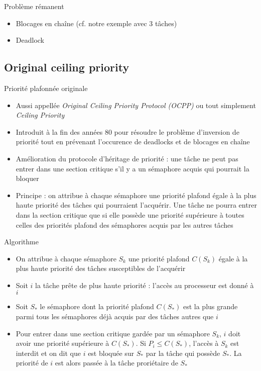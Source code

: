 \begin{frame}{Problème rémanent} 
  \begin{itemize}
  \item Blocages en chaîne (cf. notre exemple avec 3 tâches)
  \item Deadlock
  \end{itemize}
\end{frame}

\subsection{Original ceiling priority}

\begin{frame}{Priorité plafonnée originale}
  \begin{itemize} 
  \item  Aussi  appellée   \emph{Original  Ceiling  Priority  Protocol
      (OCPP)} ou tout simplement \emph{Ceiling Priority}
  \item Introduit  à la  fin des années  80 pour résoudre  le problème
    d'inversion de priorité tout en prévenant l'occurence de deadlocks
    et de blocages en chaîne
  \item Amélioration  du protocole d'héritage de priorité  : une tâche
    ne peut pas entrer dans une section critique s'il y a un sémaphore
    acquis qui pourrait la bloquer
  \item Principe : on attribue à chaque sémaphore une priorité plafond
    égale  à  la  plus   haute  priorité  des  tâches  qui  pourraient
    l'acquérir. Une  tâche ne pourra  entrer dans la  section critique
    que si  elle possède une  priorité supérieure à toutes  celles des
    priorités plafond des sémaphores acquis par les autres tâches
  \end{itemize} 
\end{frame} 

\begin{frame}{Algorithme}
  \begin{itemize} 
  \item  On attribue  à chaque  sémaphore $S_k$  une  priorité plafond
    $C(S_k)$ égale à la plus haute priorité des tâches susceptibles de
    l'acquérir
  \item Soit  $i$ la tâche prête  de plus haute priorité  : l'accès au
    processeur est donné à $i$
  \item Soit $S_*$ le sémaphore dont la priorité plafond $C(S_*)$ est la
    plus grande parmi  tous les sémaphores déjà acquis  par des tâches
    autres que $i$
  \item Pour entrer dans une  section critique gardée par un sémaphore
    $S_k$, $i$ doit avoir une  priorité supérieure à $C(S_*)$. Si $P_i
    ≤ C(S_*)$,  l'accès à  $S_k$ est  interdit et on  dit que  $i$ est
    bloquée sur $S_*$  par la tâche qui possède  $S_*$. La priorité de
    $i$ est alors passée à la tâche proriétaire de $S_*$
  \end{itemize} 
\end{frame} 

